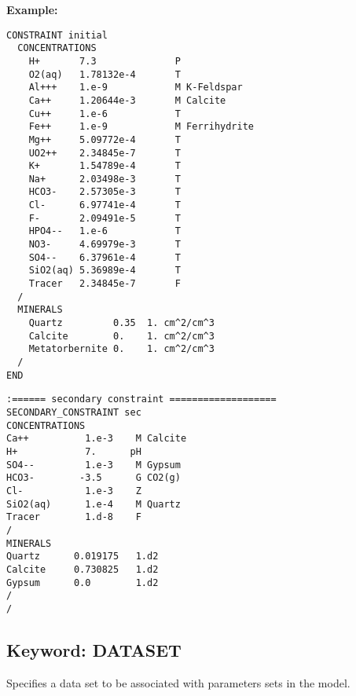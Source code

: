 \begin{mdframed}

\noindent
{\bf Example:}
\begin{verbatim}
CONSTRAINT initial
  CONCENTRATIONS
    H+       7.3              P
    O2(aq)   1.78132e-4       T
    Al+++    1.e-9            M K-Feldspar
    Ca++     1.20644e-3       M Calcite
    Cu++     1.e-6            T
    Fe++     1.e-9            M Ferrihydrite
    Mg++     5.09772e-4       T
    UO2++    2.34845e-7       T
    K+       1.54789e-4       T
    Na+      2.03498e-3       T
    HCO3-    2.57305e-3       T
    Cl-      6.97741e-4       T
    F-       2.09491e-5       T
    HPO4--   1.e-6            T
    NO3-     4.69979e-3       T
    SO4--    6.37961e-4       T
    SiO2(aq) 5.36989e-4       T
    Tracer   2.34845e-7       F
  /
  MINERALS
    Quartz         0.35  1. cm^2/cm^3
    Calcite        0.    1. cm^2/cm^3
    Metatorbernite 0.    1. cm^2/cm^3
  /
END
\end{verbatim}
\end{mdframed}

\begin{mdframed}
\begin{Verbatim}
:====== secondary constraint ===================
SECONDARY_CONSTRAINT sec
CONCENTRATIONS
Ca++          1.e-3    M Calcite
H+            7.      pH
SO4--         1.e-3    M Gypsum
HCO3-        -3.5      G CO2(g)
Cl-           1.e-3    Z
SiO2(aq)      1.e-4    M Quartz
Tracer        1.d-8    F
/
MINERALS
Quartz      0.019175   1.d2
Calcite     0.730825   1.d2
Gypsum      0.0        1.d2
/
/
\end{Verbatim}

\end{mdframed}


\hyperlink{target_key}{\return}


\newpage
\protect\hypertarget{target_datset}{}

\subsection{Keyword: DATASET}

Specifies a data set to be associated with parameters sets in the model.


